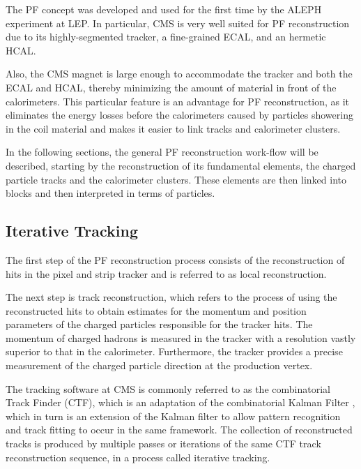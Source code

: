 The PF concept was developed and used for the first time by the ALEPH experiment at LEP\cite{BUSKULIC1995481}. In particular, CMS is very well suited for PF reconstruction due to its highly-segmented tracker,  a fine-grained ECAL, and an hermetic HCAL.

Also, the CMS magnet is large enough to accommodate the tracker and both the ECAL and HCAL, thereby minimizing the amount of material in front of the calorimeters. This particular feature is an advantage for PF reconstruction, as it eliminates the energy losses before the calorimeters caused by particles showering in the coil material and makes it easier to link tracks and calorimeter clusters.

In the following sections, the general PF reconstruction work-flow will be described, starting by the reconstruction of its fundamental elements, the charged particle tracks and the calorimeter clusters. These elements are then linked into blocks and then interpreted in terms of particles.

\subsection{Iterative Tracking}

The first step of the PF reconstruction process consists of the reconstruction of hits in the pixel and strip tracker\cite{TRK-11-001} and is referred to as local reconstruction.

The next step is track reconstruction, which refers to the process of using the reconstructed hits to obtain estimates for the momentum and position parameters of the charged particles responsible for the tracker hits. The momentum of charged hadrons is measured in the tracker with a resolution vastly superior to that in the calorimeter. Furthermore, the tracker provides a precise measurement of the charged particle direction at the production vertex. 

The tracking software at CMS\cite{TRK-11-001} is commonly referred to as the combinatorial Track Finder (CTF), which is an adaptation of the combinatorial Kalman Filter \cite{Billoir:1989mh,BILLOIR1990219,Mankel:1997dy}, which in turn is an extension of the Kalman filter\cite{Fruhwirth:1987fm} to allow pattern recognition and track fitting to occur in the same framework. The collection of reconstructed tracks is produced by multiple passes or iterations of the same CTF track reconstruction sequence, in a process called iterative tracking. 

